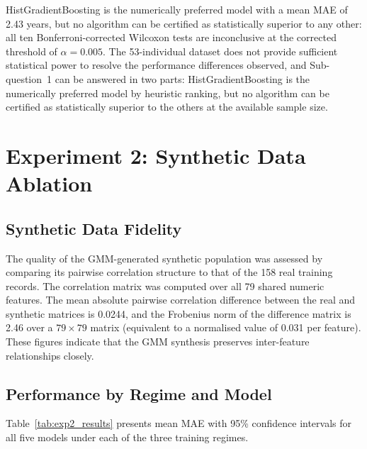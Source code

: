 \documentclass[11pt,a4paper]{report}
\begin{document}
HistGradientBoosting is the numerically preferred model with a mean MAE of 2.43 years, but no
algorithm can be certified as statistically superior to any other: all ten Bonferroni-corrected
Wilcoxon tests are inconclusive at the corrected threshold of $\alpha = 0.005$. The 53-individual
dataset does not provide sufficient statistical power to resolve the performance differences
observed, and Sub-question~1 can be answered in two parts: HistGradientBoosting is the numerically preferred
model by heuristic ranking, but no algorithm can be certified as statistically superior to the
others at the available sample size.

\section{Experiment 2: Synthetic Data Ablation}

\subsection{Synthetic Data Fidelity}

The quality of the GMM-generated synthetic population was assessed by comparing its pairwise
correlation structure to that of the 158 real training records. The correlation matrix was computed
over all 79 shared numeric features. The mean absolute pairwise correlation difference between the
real and synthetic matrices is 0.0244, and the Frobenius norm of the difference matrix is 2.46 over
a $79 \times 79$ matrix (equivalent to a normalised value of 0.031 per feature). These figures
indicate that the GMM synthesis preserves inter-feature relationships closely.

\subsection{Performance by Regime and Model}

Table~\ref{tab:exp2_results} presents mean MAE with 95\% confidence intervals for all five models
under each of the three training regimes.
\end{document}
